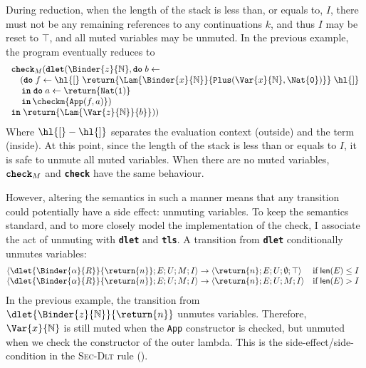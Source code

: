 During reduction, when the length of the stack is less than, or equals to, $I$, there must not be any remaining references to any continuations $k$, and thus $I$ may be reset to $\top$, and all muted variables may be unmuted. In the previous example, the program eventually reduces to 
\[\begin{array}{l}
  \textbf{\texttt{check}}_M(\textbf{\texttt{dlet}}(\Binder{z}{\mathbb{N}}, \textbf{\texttt{do}} \; b \leftarrow \, \\ 
  \quad (\textbf{\texttt{do}} \; f \leftarrow \hl{[}\; \return{\Lam{\Binder{x}{\mathbb{N}}}{\texttt{Plus}(\Var{x}{\mathbb{N}}, \Nat{\texttt{0}})}}\; \hl{]} \\ 
  \, \quad \textbf{\texttt{in}} \; \textbf{\texttt{do}} \; {a}\leftarrow {\return{\texttt{Nat}(\texttt{1})}}\\
  \, \quad \textbf{\texttt{in}} \, {\checkm{\texttt{App}(f, a)}})\; \\
  \textbf{\texttt{in}} \; \return{\Lam{\Var{z}{\mathbb{N}}}{b}})) 
\end{array}\]
Where $\hl{[}-\hl{]}$ separates the evaluation context (outside) and the term (inside). At this point, since the length of the stack is less than or equals to $I$, it is safe to unmute all muted variables. When there are no muted variables, $\textbf{\texttt{check}}_M$ and \textbf{\texttt{check}} have the same behaviour.

However, altering the semantics in such a manner means that any transition could potentially have a side effect: unmuting variables. To keep the semantics standard, and to more closely model the implementation of the check, I associate the act of unmuting with \textbf{\texttt{dlet}} and \textbf{\texttt{tls}}. A transition from \textbf{\texttt{dlet}} conditionally unmutes variables: 
\[\begin{array}{@{}ll}
  \langle \dlet{\Binder{\alpha}{R}}{\return{n}}; E; U; M; I \rangle \to \langle \return{n}; E; U; \emptyset; \top\rangle & \text{if} \; \textsf{len}(E) \leq I\\
  \langle \dlet{\Binder{\alpha}{R}}{\return{n}}; E; U; M; I \rangle \to \langle \return{n}; E; U; M; I \rangle & \text{if} \; \textsf{len}(E) > I
\end{array}\] 
In the previous example, the transition from $\dlet{\Binder{z}{\mathbb{N}}}{\return{n}}$ unmutes variables. Therefore, $\Var{x}{\mathbb{N}}$ is still muted when the \texttt{App} constructor is checked, but unmuted when we check the constructor of the outer lambda. 
This is the side-effect/side-condition in the \textsc{Sec-Dlt} rule ().

